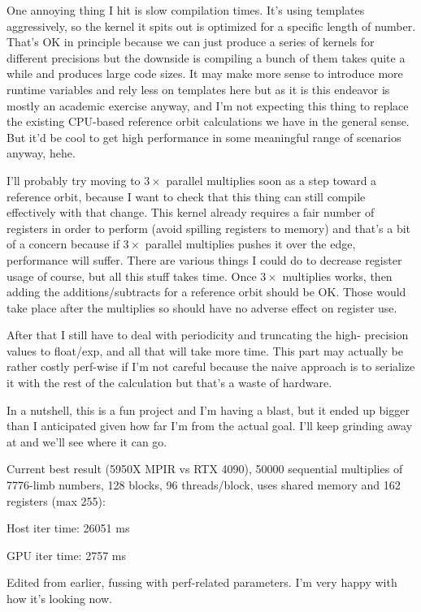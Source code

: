 One annoying thing I hit is slow compilation times.  It's using templates 
aggressively, so the kernel it spits out is optimized for a specific length of 
number.  That's OK in principle because we can just produce a series of kernels 
for different precisions but the downside is compiling a bunch of them takes 
quite a while and produces large code sizes.  It may make more sense to 
introduce more runtime variables and rely less on templates here but as it is 
this endeavor is mostly an academic exercise anyway, and I'm not expecting this 
thing to replace the existing CPU-based reference orbit calculations we have in 
the general sense.  But it'd be cool to get high performance in some meaningful 
range of scenarios anyway, hehe.

I'll probably try moving to $3\times$ parallel multiplies soon as a step toward 
a reference orbit, because I want to check that this thing can still compile 
effectively with that change.  This kernel already requires a fair number of 
registers in order to perform (avoid spilling registers to memory) and that's a 
bit of a concern because if $3\times$ parallel multiplies pushes it over the 
edge, performance will suffer.  There are various things I could do to decrease 
register usage of course, but all this stuff takes time.  Once $3\times$ 
multiplies works, then adding the additions/subtracts for a reference orbit 
should be OK.  Those would take place after the multiplies so should have no 
adverse effect on register use.

After that I still have to deal with periodicity and truncating the high-
precision values to float/exp, and all that will take more time.  This part may 
actually be rather costly perf-wise if I'm not careful because the naive 
approach is to serialize it with the rest of the calculation but that's a waste 
of hardware.

In a nutshell, this is a fun project and I'm having a blast, but it ended up 
bigger than I anticipated given how far I'm from the actual goal.  I'll keep 
grinding away at and we'll see where it can go.

Current best result (5950X MPIR vs RTX 4090), 50000 sequential multiplies of 
7776-limb numbers, 128 blocks, 96 threads/block, uses shared memory and 162 
registers (max 255):

Host iter time: 26051 ms

GPU iter time: 2757 ms

Edited from earlier, fussing with perf-related parameters.  I'm very happy with how it's looking now.

